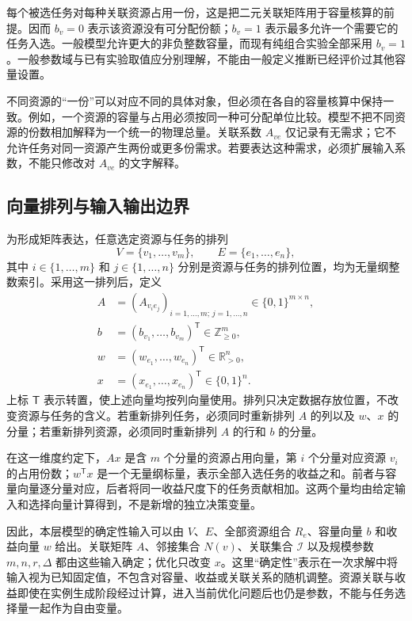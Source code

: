 每个被选任务对每种关联资源占用一份，这是把二元关联矩阵用于容量核算的前提。因而 $b_v=0$ 表示该资源没有可分配份额；$b_v=1$ 表示最多允许一个需要它的任务入选。一般模型允许更大的非负整数容量，而现有纯组合实验全部采用 $b_v=1$。一般参数域与已有实验取值应分别理解，不能由一般定义推断已经评价过其他容量设置。

不同资源的“一份”可以对应不同的具体对象，但必须在各自的容量核算中保持一致。例如，一个资源的容量与占用必须按同一种可分配单位比较。模型不把不同资源的份数相加解释为一个统一的物理总量。关联系数 $A_{ve}$ 仅记录有无需求；它不允许任务对同一资源产生两份或更多份需求。若要表达这种需求，必须扩展输入系数，不能只修改对 $A_{ve}$ 的文字解释。

\subsection{向量排列与输入输出边界}

为形成矩阵表达，任意选定资源与任务的排列
\begin{equation}
 V=\{v_1,\ldots,v_m\},\qquad
 E=\{e_1,\ldots,e_n\},
 \label{s0202:index_order}
\end{equation}
其中 $i\in\{1,\ldots,m\}$ 和 $j\in\{1,\ldots,n\}$ 分别是资源与任务的排列位置，均为无量纲整数索引。采用这一排列后，定义
\begin{align}
 A&=(A_{v_i e_j})_{i=1,\ldots,m;\,j=1,\ldots,n}
       \in\{0,1\}^{m\times n},
 \label{s0202:matrix_dimension}\\
 b&=(b_{v_1},\ldots,b_{v_m})^{\mathsf T}
       \in\mathbb Z_{\geq0}^{m},
 \label{s0202:capacity_dimension}\\
 w&=(w_{e_1},\ldots,w_{e_n})^{\mathsf T}
       \in\mathbb R_{>0}^{n},
 \label{s0202:weight_dimension}\\
 x&=(x_{e_1},\ldots,x_{e_n})^{\mathsf T}
       \in\{0,1\}^{n}.
 \label{s0202:decision_dimension}
\end{align}
上标 $\mathsf T$ 表示转置，使上述向量均按列向量使用。排列只决定数据存放位置，不改变资源与任务的含义。若重新排列任务，必须同时重新排列 $A$ 的列以及 $w$、$x$ 的分量；若重新排列资源，必须同时重新排列 $A$ 的行和 $b$ 的分量。

在这一维度约定下，$Ax$ 是含 $m$ 个分量的资源占用向量，第 $i$ 个分量对应资源 $v_i$ 的占用份数；$w^{\mathsf T}x$ 是一个无量纲标量，表示全部入选任务的收益之和。前者与容量向量逐分量对应，后者将同一收益尺度下的任务贡献相加。这两个量均由给定输入和选择向量计算得到，不是新增的独立决策变量。

因此，本层模型的确定性输入可以由 $V$、$E$、全部资源组合 $R_e$、容量向量 $b$ 和收益向量 $w$ 给出。关联矩阵 $A$、邻接集合 $N(v)$、关联集合 $\mathcal I$ 以及规模参数 $m,n,r,\Delta$ 都由这些输入确定；优化只改变 $x$。这里“确定性”表示在一次求解中将输入视为已知固定值，不包含对容量、收益或关联关系的随机调整。资源关联与收益即使在实例生成阶段经过计算，进入当前优化问题后也仍是参数，不能与任务选择量一起作为自由变量。
